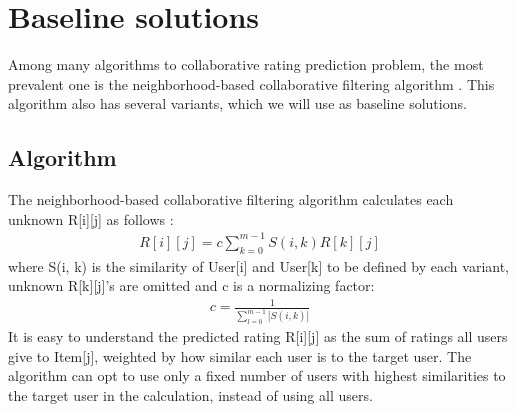 \documentclass[letterpaper]{article}
\begin{document}
\section{Baseline solutions}
Among many algorithms to collaborative rating prediction problem,
the most prevalent one is the neighborhood-based collaborative filtering 
algorithm \citeauthor{su2009survey}.
This algorithm also has several variants,
which we will use as baseline solutions.

\subsection{Algorithm}
The neighborhood-based collaborative filtering algorithm calculates each 
unknown R[i][j] as 
follows \citeauthor{su2009survey}:
\begin{align*}
R[i][j] = c \sum_{k = 0}^{m-1} S(i, k) R[k][j]
\end{align*}
where S(i, k) is the similarity of User[i] and User[k] to be defined by each 
variant,
unknown R[k][j]'s are omitted and c is a normalizing factor:
\begin{align*}
	c = \frac{1}{\sum_{l = 0}^{m - 1} |S(i, k)|}
\end{align*}
It is easy to understand the predicted rating R[i][j] as the sum of ratings all 
users give to Item[j],
weighted by how similar each user is to the target user.
The algorithm can opt to use only a fixed number of users with highest 
similarities to the target user in the calculation, instead of using all users.
\end{document}
